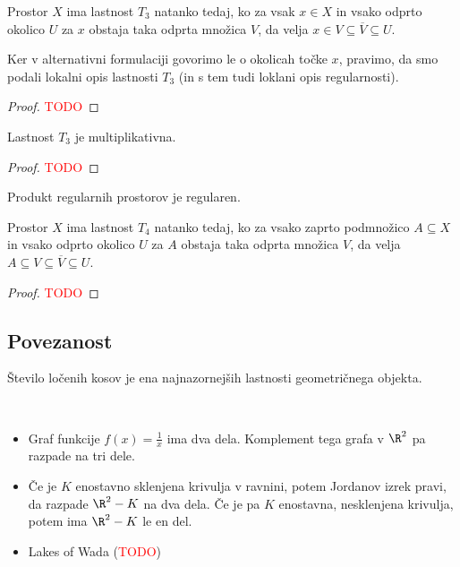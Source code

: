 \begin{trditev}
    Prostor $X$ ima lastnost $T_3$ natanko tedaj, ko za vsak $x \in X$ in vsako odprto okolico $U$ za $x$ obstaja taka odprta množica $V$, da velja $x \in V \subseteq \overline{V} \subseteq U$.
\end{trditev}

\begin{opomba}
    Ker v alternativni formulaciji govorimo le o okolicah točke $x$, pravimo, da smo podali lokalni opis lastnosti $T_3$ (in s tem tudi loklani opis regularnosti).
\end{opomba}

\begin{proof}
    \textcolor{red}{TODO}
\end{proof}

\begin{trditev}
    Lastnost $T_3$ je multiplikativna.
\end{trditev}

\begin{proof}
    \textcolor{red}{TODO}
\end{proof}

\begin{posledica}
    Produkt regularnih prostorov je regularen.
\end{posledica}

\newpage
\begin{trditev}
    Prostor $X$ ima lastnost $T_4$ natanko tedaj, ko za vsako zaprto podmnožico $A \subseteq X$ in vsako odprto okolico $U$ za $A$ obstaja taka odprta množica $V$, da velja $A \subseteq V \subseteq \overline{V} \subseteq U$.
\end{trditev}


\begin{proof}
    \textcolor{red}{TODO}
\end{proof}

\subsection{Povezanost}
Število ločenih kosov je ena najnazornejših lastnosti geometričnega objekta.

\begin{primer}
    \ 
    \begin{itemize}
        \item Graf funkcije $f(x) = \frac{1}{x}$ ima dva dela. Komplement tega grafa v $\R^2$ pa razpade na tri dele.
        \item Če je $K$ enostavno sklenjena krivulja v ravnini, potem Jordanov izrek pravi, da razpade $\R^2-K$ na dva dela. Če je pa $K$ enostavna, nesklenjena krivulja, potem ima $\R^2-K$ le en del.
        \item Lakes of Wada (\textcolor{red}{TODO})
    \end{itemize}
\end{primer}

